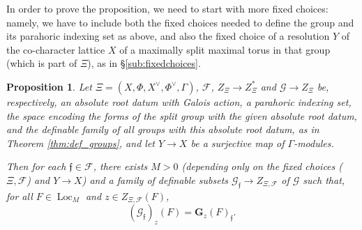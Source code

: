 \documentclass{amsart}
\newcommand{\cF}{\mathcal{F}}
\newcommand{\cG}{\mathcal{G}}
\DeclareMathOperator{\loc}{Loc}
\newcommand{\bG}{\mathbf{G}}
\newcommand{\ff}{{\mathfrak f}}
\theoremstyle{plain}
\newtheorem{prop}[thm]{Proposition}
\theoremstyle{definition}
\begin{document}
In order to prove the proposition, we need to start with  more fixed choices: namely, we have to include both the fixed choices needed to define the group and its parahoric indexing set as above, and also the fixed choice of a resolution $Y$ of the co-character lattice $X$ of a maximally split maximal torus in that group (which is part of $\Xi$), as in 
\S \ref{sub:fixedchoices}. 

 
\begin{prop}\label{prop:main}
 Let $\Xi=(X,\Phi, X^\vee, \Phi^\vee, \Gamma)$,  $\cF$, $Z_\Xi\to Z_\Xi^\ast$ and $\cG\to Z_\Xi$ be, respectively, an absolute root datum with Galois action, a parahoric indexing set, the space encoding the forms of the split group with the given absolute root datum, and the definable family of all groups with this absolute root datum, as in Theorem \ref{thm:def_groups}, and let $Y\to X$ be a surjective map of $\Gamma$-modules. 

Then for each $\ff \in \cF$, there exists $M>0$ (depending only on the fixed choices ($\Xi, \cF$) and $Y\to X$) and a family of definable 
subsets $\cG_{\ff} \to Z_{\Xi, \cF}$ of $\cG$
 such that, for all $F\in \loc_M$ and $z\in Z_{\Xi, \cF}(F)$, 
\[
(\cG_{\ff})_{z}(F)= \bG_z(F)_{\ff}.
\]
\end{prop}
\end{document}
